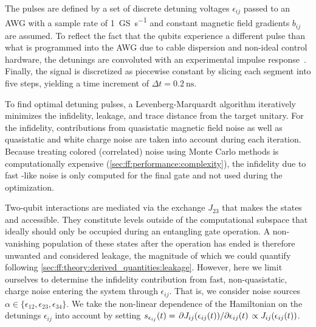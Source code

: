 The pulses are defined by a set of discrete detuning voltages $\epsilon_{ij}$ passed to an AWG with a sample rate of \qty{1}{\giga S\per\second} and constant magnetic field gradients $b_{ij}$ are assumed.
To reflect the fact that the qubits experience a different pulse than what is programmed into the AWG due to cable dispersion and non-ideal control hardware, the detunings are convoluted with an experimental impulse response~\cite{Cerfontaine2020b}.
Finally, the signal is discretized as piecewise constant by slicing each segment into five steps, yielding a time increment of $\Delta t = \qty{0.2}{\nano\second}$.

To find optimal detuning pulses, a Levenberg-Marquardt algorithm iteratively minimizes the infidelity, leakage, and trace distance from the target unitary.
For the infidelity, contributions from quasistatic magnetic field noise as well as quasistatic and white charge noise are taken into account during each iteration.
Because treating colored (correlated) noise using Monte Carlo methods is computationally expensive (\cf \cref{sec:ff:performance:complexity}), the infidelity due to fast \oneoverf-like noise is only computed for the final gate and not used during the optimization.

Two-qubit interactions are mediated via the exchange $J_{23}$ that makes the states \ketuudd and \ketdduu accessible.
They constitute levels outside of the computational subspace that ideally should only be occupied during an entangling gate operation.
A non-vanishing population of these states after the operation has ended is therefore unwanted and considered leakage, the magnitude of which we could quantify following \cref{sec:ff:theory:derived_quantities:leakage}.
However, here we limit ourselves to determine the infidelity contribution from fast, \viz non-quasistatic, charge noise entering the system through $\epsilon_{ij}$.
That is, we consider noise sources $\alpha\in\lbrace\epsilon_{12},\epsilon_{23},\epsilon_{34}\rbrace$.
We take the non-linear dependence of the Hamiltonian on the detunings $\epsilon_{ij}$ into account by setting $s_{\epsilon_{ij}}(t) = \pdv*{J_{ij}(\epsilon_{ij}(t))}{\epsilon_{ij}(t)}\propto J_{ij}(\epsilon_{ij}(t))$.

